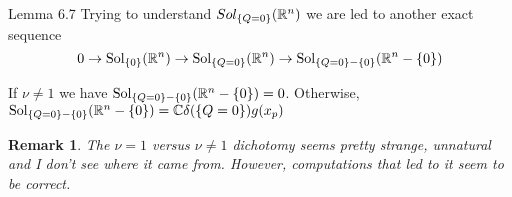 \documentclass[8pt]{beamer}
\newcommand{\Sol}{\mbox{Sol}}
\theoremstyle{mystyle}
\newtheorem*{remark}{Remark}
\begin{document}
\begin{frame}{Lemma 6.7}
	Trying to understand $Sol_{\left\{Q=0\right\}}(\mathbb{R}^n)$ we are led to another exact sequence
	\[0\rightarrow\Sol_{\mycbra{0}}(\R^n)\rightarrow\Sol_{\mycbra{Q=0}}(\R^n)\rightarrow
		\Sol_{\mycbra{Q=0}-\mycbra{0}}(\R^n-\mycbra{0})\]
\begin{theorem}
	If $\nu\neq1$ we have $\Sol_{\mycbra{Q=0}-\mycbra{0}}(\R^n-\mycbra{0})=0$. Otherwise,
	$\Sol_{\mycbra{Q=0}-\mycbra{0}}(\R^n-\mycbra{0})=\C\delta(\mycbra{Q=0})g(x_p)$\footnotemark
\end{theorem}
\begin{remark}
	The $\nu=1$ versus $\nu\neq1$ dichotomy seems pretty strange, unnatural and I don't see where it came from. However,
	computations that led to it seem to be correct.
\end{remark}
\end{frame}
\end{document}
